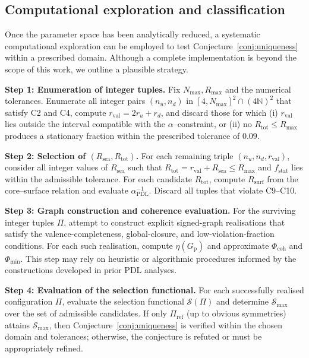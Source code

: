 \documentclass[11pt,a4paper]{article}
\begin{document}
\subsection{Computational exploration and classification}

Once the parameter space has been analytically reduced, a systematic computational exploration can be employed to test Conjecture~\ref{conj:uniqueness} within a prescribed domain. Although a complete implementation is beyond the scope of this work, we outline a plausible strategy.

\medskip
\noindent\textbf{Step 1: Enumeration of integer tuples.} Fix $N_{\max},R_{\max}$ and the numerical tolerances. Enumerate all integer pairs $(n_u,n_d)$ in $[4,N_{\max}]^{2}\cap(4\mathbb{N})^{2}$ that satisfy C2 and C4, compute $r_{\mathrm{val}}=2r_u+r_d$, and discard those for which (i) $r_{\mathrm{val}}$ lies outside the interval compatible with the $\alpha$–constraint, or (ii) no $R_{\mathrm{tot}}\leq R_{\max}$ produces a stationary fraction within the prescribed tolerance of $0.09$.\cite{LaubscherPDLFull2026,LaubscherDerivationAlpha2026}

\medskip
\noindent\textbf{Step 2: Selection of $(R_{\mathrm{sea}},R_{\mathrm{tot}})$.} For each remaining triple $(n_u,n_d,r_{\mathrm{val}})$, consider all integer values of $R_{\mathrm{sea}}$ such that $R_{\mathrm{tot}}=r_{\mathrm{val}}+R_{\mathrm{sea}}\leq R_{\max}$ and $f_{\mathrm{stat}}$ lies within the admissible tolerance. For each candidate $R_{\mathrm{tot}}$, compute $R_{\mathrm{surf}}$ from the core–surface relation and evaluate $\alpha_{\mathrm{PDL}}^{-1}$. Discard all tuples that violate C9–C10.

\medskip
\noindent\textbf{Step 3: Graph construction and coherence evaluation.} For the surviving integer tuples $\Pi$, attempt to construct explicit signed-graph realisations that satisfy the valence-completeness, global-closure, and low-violation-fraction conditions. For each such realisation, compute $\eta(G_{\mathrm{p}})$ and approximate $\Phi_{\mathrm{coh}}$ and $\Phi_{\mathrm{min}}$. This step may rely on heuristic or algorithmic procedures informed by the constructions developed in prior PDL analyses.\cite{LaubscherPDLFull2026,LaubscherLDP2026}

\medskip
\noindent\textbf{Step 4: Evaluation of the selection functional.} For each successfully realised configuration $\Pi$, evaluate the selection functional $\mathcal{S}(\Pi)$ and determine $\mathcal{S}_{\max}$ over the set of admissible candidates. If only $\Pi_{\mathrm{ref}}$ (up to obvious symmetries) attains $\mathcal{S}_{\max}$, then Conjecture~\ref{conj:uniqueness} is verified within the chosen domain and tolerances; otherwise, the conjecture is refuted or must be appropriately refined.
\end{document}
